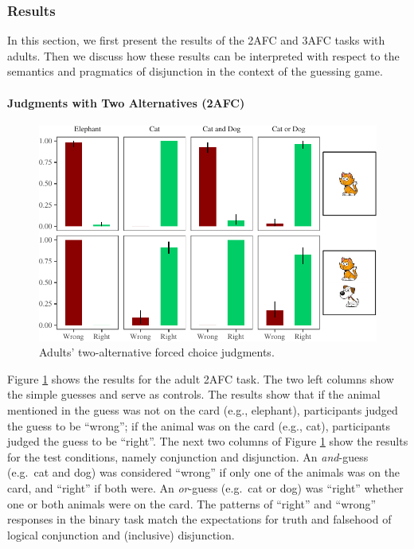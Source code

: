 \documentclass[floatsintext,man]{apa6}
\theoremstyle{definition}
\theoremstyle{definition}
\theoremstyle{definition}
\theoremstyle{remark}
\begin{document}
\subsubsection{Results}\label{results}

In this section, we first present the results of the 2AFC and 3AFC tasks
with adults. Then we discuss how these results can be interpreted with
respect to the semantics and pragmatics of disjunction in the context of
the guessing game.

\paragraph{Judgments with Two Alternatives
(2AFC)}\label{judgments-with-two-alternatives-2afc}

\begin{figure}
\centering
\includegraphics{figs/binaryAdultsPlot-1.pdf}
\caption{\label{fig:binaryAdultsPlot}Adults' two-alternative forced choice
judgments.}
\end{figure}

Figure \ref{fig:binaryAdultsPlot} shows the results for the adult 2AFC
task. The two left columns show the simple guesses and serve as
controls. The results show that if the animal mentioned in the guess was
not on the card (e.g., elephant), participants judged the guess to be
\enquote{wrong}; if the animal was on the card (e.g., cat), participants
judged the guess to be \enquote{right}. The next two columns of Figure
\ref{fig:binaryAdultsPlot} show the results for the test conditions,
namely conjunction and disjunction. An \emph{and}-guess (e.g.~cat and
dog) was considered \enquote{wrong} if only one of the animals was on
the card, and \enquote{right} if both were. An \emph{or}-guess (e.g.~cat
or dog) was \enquote{right} whether one or both animals were on the
card. The patterns of \enquote{right} and \enquote{wrong} responses in
the binary task match the expectations for truth and falsehood of
logical conjunction and (inclusive) disjunction.
\end{document}
